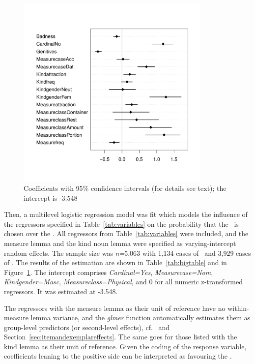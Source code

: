 \begin{figure}[hb!]
  \centering
  \includegraphics[width=0.85\textwidth]{../R/output/corpus_fixeffs}
  \caption{Coefficients with 95\% confidence intervals (for details see text); the intercept is -3.548}
  \label{fig:fixeffs}
\end{figure}

Then, a multilevel logistic regression model was fit which models the influence of the regressors specified in Table~\ref{tab:variables} on the probability that the \PGCa\ is chosen over the \NACa.
All regressors from Table~\ref{tab:variables} were included, and the measure lemma and the kind noun lemma were specified as varying-intercept random effects.
The sample size was \textit{n=}5,063 with 1,134 cases of \PGCa\ and 3,929 cases of \NACa.
The results of the estimation are shown in Table~\ref{tab:bigtable} and in Figure~\ref{fig:fixeffs}.
The intercept comprises \textit{Cardinal=Yes}, \textit{Measurecase=Nom}, \textit{Kindgender=Masc}, \textit{Measureclass=Physical}, and 0 for all numeric z-transformed regressors.
It was estimated at -3.548.

The regressors with the measure lemma as their unit of reference have no within-measure lemma variance, and the \textit{glmer} function automatically estimates them as group-level predictors (or second-level effects), cf.\ \citet[265--269,302--304]{GelmanHill2006} and Section~\ref{sec:itemandexemplareffects}.
The same goes for those listed with the kind lemma as their unit of reference.
Given the coding of the response variable, coefficients leaning to the positive side can be interpreted as favouring the \PGCa.

